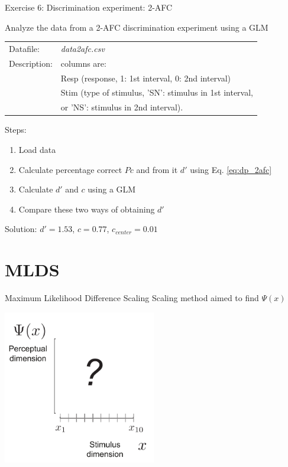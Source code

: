 \documentclass[10pt]{beamer}
\begin{document}
\begin{frame}[fragile]{Exercise 6: Discrimination experiment: 2-AFC}

Analyze the data from a 2-AFC discrimination experiment using a GLM

\begin{tabular}{ll}
Datafile: & \textit{data2afc.csv}\\
Description: & columns are: \\
& Resp (response, 1: 1st interval, 0: 2nd interval)\\
& Stim (type of stimulus, 'SN': stimulus in 1st interval, \\
& or 'NS': stimulus in 2nd interval).
\end{tabular}

\vspace{10pt}


Steps:
\begin{enumerate}
\item Load data
\item Calculate percentage correct $Pc$ and from it $d'$ using Eq. \autoref{eq:dp_2afc}
\item Calculate $d'$ and $c$ using a GLM
\item Compare these two ways of obtaining $d'$
\end{enumerate}

\pause
\begin{center}
Solution: $d' = 1.53$, $c=0.77$, $c_{center} = 0.01$
\end{center}
\end{frame}



\section{MLDS}
\begin{frame}{Maximum Likelihood Difference Scaling}
Scaling method aimed to find $\Psi(x)$
\begin{center}
\includegraphics[width=0.5\textwidth]{figs/scaling_stimspacing.pdf}
\end{center}
\end{frame}
\end{document}
